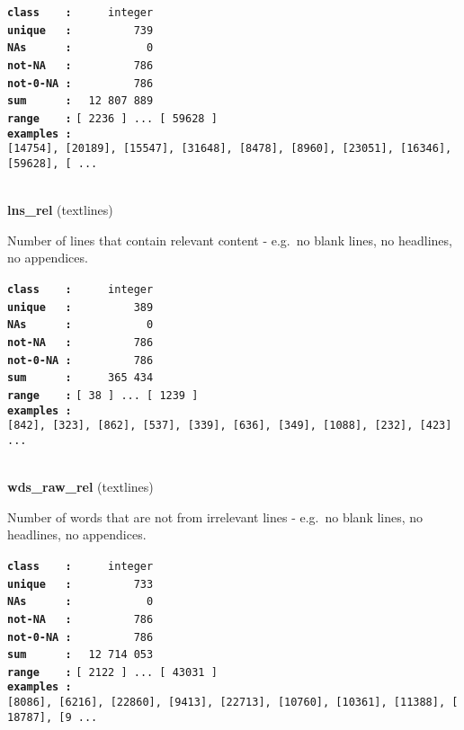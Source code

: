 \documentclass[]{article}
\begin{document}
\textbf{\texttt{class\ \ \ \ :}} \texttt{~~~~~integer}\\
\textbf{\texttt{unique\ \ \ :}} \texttt{~~~~~~~~~739}\\
\textbf{\texttt{NAs\ \ \ \ \ \ :}} \texttt{~~~~~~~~~~~0}\\
\textbf{\texttt{not-NA\ \ \ :}} \texttt{~~~~~~~~~786}\\
\textbf{\texttt{not-0-NA\ :}} \texttt{~~~~~~~~~786}\\
\textbf{\texttt{sum\ \ \ \ \ \ :}} \texttt{~~12~807~889}\\
\textbf{\texttt{range\ \ \ \ :}}
\texttt{{[}\ 2236\ {]}\ ...\ {[}\ 59628\ {]}}\\
\textbf{\texttt{examples\ :}}
\texttt{{[}14754{]},\ {[}20189{]},\ {[}15547{]},\ {[}31648{]},\ {[}8478{]},\ {[}8960{]},\ {[}23051{]},\ {[}16346{]},\ {[}59628{]},\ {[}\ ...}\\

~

\textbf{lns\_rel} (textlines)

Number of lines that contain relevant content - e.g.~no blank lines, no
headlines, no appendices.

\textbf{\texttt{class\ \ \ \ :}} \texttt{~~~~~integer}\\
\textbf{\texttt{unique\ \ \ :}} \texttt{~~~~~~~~~389}\\
\textbf{\texttt{NAs\ \ \ \ \ \ :}} \texttt{~~~~~~~~~~~0}\\
\textbf{\texttt{not-NA\ \ \ :}} \texttt{~~~~~~~~~786}\\
\textbf{\texttt{not-0-NA\ :}} \texttt{~~~~~~~~~786}\\
\textbf{\texttt{sum\ \ \ \ \ \ :}} \texttt{~~~~~365~434}\\
\textbf{\texttt{range\ \ \ \ :}}
\texttt{{[}\ 38\ {]}\ ...\ {[}\ 1239\ {]}}\\
\textbf{\texttt{examples\ :}}
\texttt{{[}842{]},\ {[}323{]},\ {[}862{]},\ {[}537{]},\ {[}339{]},\ {[}636{]},\ {[}349{]},\ {[}1088{]},\ {[}232{]},\ {[}423{]}\ ...}\\

~

\textbf{wds\_raw\_rel} (textlines)

Number of words that are not from irrelevant lines - e.g.~no blank
lines, no headlines, no appendices.

\textbf{\texttt{class\ \ \ \ :}} \texttt{~~~~~integer}\\
\textbf{\texttt{unique\ \ \ :}} \texttt{~~~~~~~~~733}\\
\textbf{\texttt{NAs\ \ \ \ \ \ :}} \texttt{~~~~~~~~~~~0}\\
\textbf{\texttt{not-NA\ \ \ :}} \texttt{~~~~~~~~~786}\\
\textbf{\texttt{not-0-NA\ :}} \texttt{~~~~~~~~~786}\\
\textbf{\texttt{sum\ \ \ \ \ \ :}} \texttt{~~12~714~053}\\
\textbf{\texttt{range\ \ \ \ :}}
\texttt{{[}\ 2122\ {]}\ ...\ {[}\ 43031\ {]}}\\
\textbf{\texttt{examples\ :}}
\texttt{{[}8086{]},\ {[}6216{]},\ {[}22860{]},\ {[}9413{]},\ {[}22713{]},\ {[}10760{]},\ {[}10361{]},\ {[}11388{]},\ {[}18787{]},\ {[}9\ ...}\\
\end{document}
